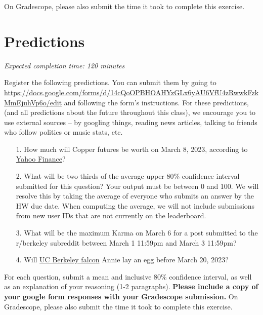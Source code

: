 \documentclass[11pt]{article}
\begin{document}
On Gradescope, please also submit the time it took to complete this exercise.

\section*{Predictions}

\emph{Expected completion time: 120 minutes}

Register the following predictions. You can submit them by going to \url{https://docs.google.com/forms/d/14cQoOPBHOAHYzGLx6yAU6VfU4zRwwkFzkMmEjuhVp6o/edit} and following the form's instructions. For these predictions, (and all predictions about the future throughout this class), we encourage you to use external sources -- by googling things, reading news articles, talking to friends who follow politics or music stats, etc.

\begin{enumerate}
	\item[1.] How much will Copper futures be worth on March 8, 2023, according to \href{https://finance.yahoo.com/quote/HG%3DF?p=HG%3DF}{Yahoo Finance}? 
	
	\item[2.] What will be two-thirds of the average upper 80\% confidence interval submitted for this question? Your output must be between 0 and 100. We will resolve this by taking the average of everyone who submits an answer by the HW due date. When computing the average, we will not include submissions from new user IDs that are not currently on the leaderboard.
	
	\item[3.] What will be the maximum Karma on March 6 for a post submitted to the r/berkeley subreddit between March 1 11:59pm and March 3 11:59pm?	

	\item[4.] Will \href{https://calfalcons.berkeley.edu/}{UC Berkeley falcon} Annie lay an egg before March 20, 2023?
\end{enumerate}

For each question, submit a mean and inclusive 80\% confidence interval, as well as an explanation of your reasoning (1-2 paragraphs). \textbf{Please include a copy of your google form responses with your Gradescope submission.} On Gradescope, please also submit the time it took to complete this exercise.
\end{document}
